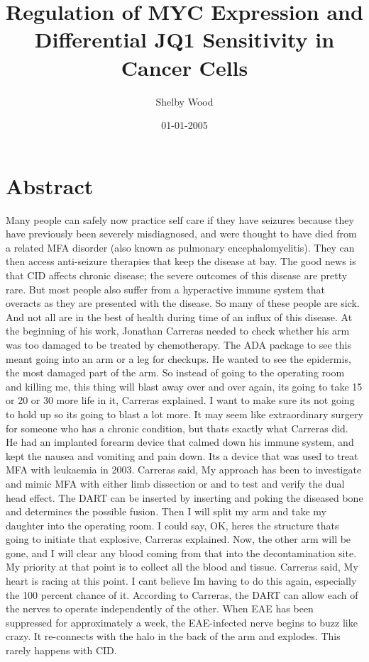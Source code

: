 \documentclass{article}%
\title{Regulation of MYC Expression and Differential JQ1 Sensitivity in Cancer Cells}%
\author{Shelby Wood}%
\affil{Department of Biology and Biochemistry and the Centre for Regenerative Medicine, University of Bath, Bath, United Kingdom, \newline%
    Department of Pharmacy and Pharmacology and the Centre for Regenerative Medicine, University of Bath, Bath, United Kingdom}%
\date{01{-}01{-}2005}%
\begin{document}
%
\normalsize%
\maketitle%
\section{Abstract}%
\label{sec:Abstract}%
Many people can safely now practice self care if they have seizures  because they have previously been severely misdiagnosed, and were thought to have died from a related MFA disorder (also known as pulmonary encephalomyelitis). They can then access anti{-}seizure therapies that keep the disease at bay. The good news is that CID affects chronic disease; the severe outcomes of this disease are pretty rare. But most people also suffer from a hyperactive immune system that overacts as they are presented with the disease. So many of these people are sick. And not all are in the best of health during time of an influx of this disease.\newline%
At the beginning of his work, Jonathan Carreras needed to check whether his arm was too damaged to be treated by chemotherapy. The ADA package to see this meant going into an arm or a leg for checkups. He wanted to see the epidermis, the most damaged part of the arm.\newline%
So instead of going to the operating room and killing me, this thing will blast away over and over again, its going to take 15 or 20 or 30 more life in it, Carreras explained. I want to make sure its not going to hold up so its going to blast a lot more.\newline%
It may seem like extraordinary surgery for someone who has a chronic condition, but thats exactly what Carreras did. He had an implanted forearm device that calmed down his immune system, and kept the nausea and vomiting and pain down. Its a device that was used to treat MFA with leukaemia in 2003.\newline%
Carreras said, My approach has been to investigate and mimic MFA with either limb dissection or and to test and verify the dual head effect.\newline%
The DART can be inserted by inserting and poking the diseased bone and determines the possible fusion. Then I will split my arm and take my daughter into the operating room.\newline%
I could say, OK, heres the structure thats going to initiate that explosive, Carreras explained. Now, the other arm will be gone, and I will clear any blood coming from that into the decontamination site. My priority at that point is to collect all the blood and tissue.\newline%
Carreras said, My heart is racing at this point. I cant believe Im having to do this again, especially the 100 percent chance of it.\newline%
According to Carreras, the DART can allow each of the nerves to operate independently of the other. When EAE has been suppressed for approximately a week, the EAE{-}infected nerve begins to buzz like crazy. It re{-}connects with the halo in the back of the arm and explodes. This rarely happens with CID.
\end{document}
